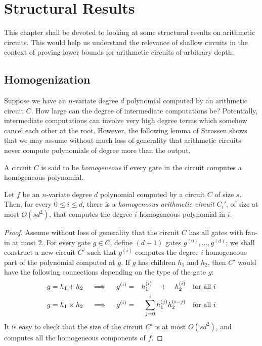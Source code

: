 \chapter{Structural Results}\label{chap:structural-results}


This chapter shall be devoted to looking at some structural results on arithmetic circuits. This would help us understand the relevance of shallow circuits in the context of proving lower bounds for arithmetic circuits of arbitrary depth. 

\section{Homogenization}\label{sec:homogenization}

Suppose we have an $n$-variate degree $d$ polynomial computed by an arithmetic circuit $C$. How large can the degree of intermediate computations be? Potentially, intermediate computations can involve very high degree terms which somehow cancel each other at the root. However, the following lemma of Strassen shows that we may assume without much loss of generality that arithmetic circuits never compute polynomials of degree more than the output. 

\begin{definition}
A circuit $C$ is said to be \emph{homogeneous} if every gate in the circuit computes a homogeneous polynomial. 
\end{definition}

\begin{lemma}[Homogenization]\label{lem:homogenization}
Let $f$ be an $n$-variate degree $d$ polynomial computed by a circuit $C$ of size $s$. Then, for every $0\leq i \leq d$, there is a \emph{homogeneous arithmetic circuit} $C_i'$, of size at most $O(sd^2)$, that computes the degree $i$ homogeneous polynomial in $i$. 
\end{lemma}
\begin{proof}
Assume without loss of generality that the circuit $C$ has all gates with fan-in at most $2$. 
For every gate $g\in C$, define $(d+1)$ gates $g^{(0)},\dots, g^{(d)}$; we shall construct a new circuit $C'$ such that $g^{(i)}$ computes the degree $i$ homogeneous part of the polynomial computed at $g$. If $g$ has children $h_1$ and $h_2$, then $C'$ would have the following connections depending on the type of the gate $g$:
\begin{eqnarray*}
\text{$g = h_1 + h_2$}\quad\implies\quad g^{(i)} &=& h_1^{(i)} \quad + \quad h_2^{(i)}\quad\text{for all $i$}\\
\text{$g = h_1 \times h_2$}\quad\implies\quad g^{(i)} &=& \sum_{j=0}^i h_1^{(j)} h_2^{(i-j)}\quad\text{for all $i$}
\end{eqnarray*}
It is easy to check that the size of the circuit $C'$ is at most $O(sd^2)$, and computes all the homogeneous components of $f$. 
\end{proof}

